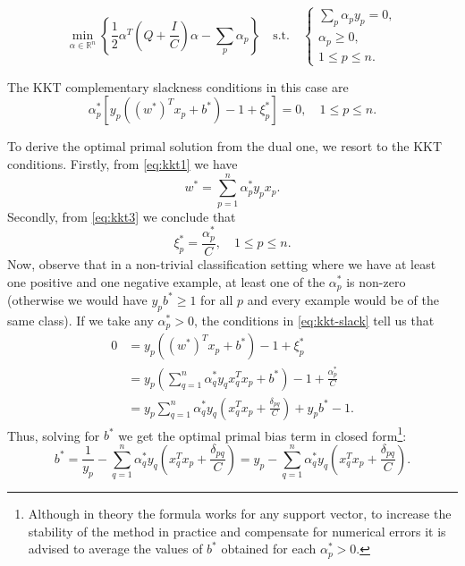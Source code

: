 \documentclass[11pt,table]{article}
\begin{document}
\[
	\min_{\alpha\in\mathbb R^n} \left\{\frac{1}{2}\alpha^T\left(Q+ \frac{I}{C}\right)\alpha - \sum_p \alpha_p\right\} \quad \text{s.t.} \quad \begin{cases}
		\displaystyle \sum_p \alpha_p y_p=0, \\
		\alpha_p\geq 0,                      \\
		1\leq p \leq n.
	\end{cases}
\]

The KKT complementary slackness conditions in this case are
\begin{equation}
	\label{eq:kkt-slack}
	\alpha_p^*[y_p((w^*)^Tx_p+b^*)-1+\xi_p^*] =0, \quad 1\leq p\leq n.
\end{equation}

To derive the optimal primal solution from the dual one, we resort to the KKT conditions. Firstly, from \eqref{eq:kkt1} we have
\[
	w^* = \sum_{p=1}^n \alpha_p^*y_px_p.
\]
Secondly, from \eqref{eq:kkt3} we conclude that
\[
	\xi_p^* = \frac{\alpha_p^*}{C},\quad 1\leq p\leq n.
\]
Now, observe that in a non-trivial classification setting where we have at least one positive and one negative example, at least one of the $\alpha^*_p$ is non-zero (otherwise we would have $y_pb^*\geq 1$ for all $p$ and every example would be of the same class). If we take any $\alpha_p^*>0$, the conditions in \eqref{eq:kkt-slack} tell us that
\begin{align*}
	0 & =y_p((w^*)^Tx_p+b^*)-1+\xi_p^*                                                           \\
	  & = y_p\left(\sum_{q=1}^n \alpha_q^*y_qx_q^Tx_p +b^*\right) - 1 + \frac{\alpha_p^*}{C}     \\
	  & = y_p\sum_{q=1}^n \alpha_q^*y_q\left(x_q^Tx_p + \frac{\delta_{pq}}{C}\right)+ y_pb^* -1.
\end{align*}
Thus, solving for $b^*$ we get the optimal primal bias term in closed form\footnote{Although in theory the formula works for any support vector, to increase the stability of the method in practice and compensate for numerical errors it is advised to average the values of $b^*$ obtained for each $\alpha^*_p>0$.}:
\[
	b^* = \frac{1}{y_p} - \sum_{q=1}^n \alpha_q^*y_q\left(x_q^Tx_p + \frac{\delta_{pq}}{C}\right)=y_p - \sum_{q=1}^n \alpha_q^*y_q\left(x_q^Tx_p + \frac{\delta_{pq}}{C}\right).
\]

\end{document}
